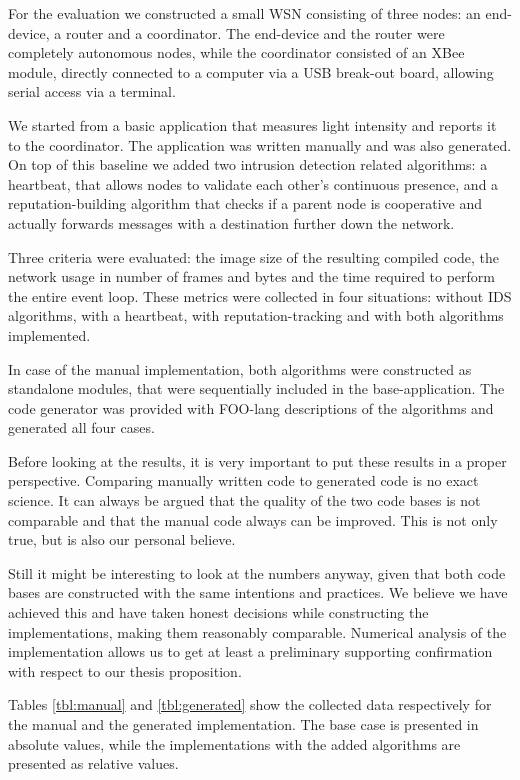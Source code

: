 \documentclass[conference]{IEEEtran}
\begin{document}
For the evaluation we constructed a small WSN consisting of three nodes: an
end-device, a router and a coordinator. The end-device and the router were
completely autonomous nodes, while the coordinator consisted of an XBee module,
directly connected to a computer via a USB break-out board, allowing serial
access via a terminal.

We started from a basic application that measures light intensity and reports
it to the coordinator. The application was written manually and was also
generated. On top of this baseline we added two intrusion detection related
algorithms: a heartbeat, that allows nodes to validate each other's continuous
presence, and a reputation-building algorithm that checks if a parent node is
cooperative and actually forwards messages with a destination further down the
network.

Three criteria were evaluated: the image size of the resulting compiled code,
the network usage in number of frames and bytes and the time required to
perform the entire event loop. These metrics were collected in four situations:
without IDS algorithms, with a heartbeat, with reputation-tracking and with
both algorithms implemented.

In case of the manual implementation, both algorithms were constructed as
standalone modules, that were sequentially included in the base-application.
The code generator was provided with FOO-lang descriptions of the algorithms
and generated all four cases.

Before looking at the results, it is very important to put these results in a
proper perspective. Comparing manually written code to generated code is no
exact science. It can always be argued that the quality of the two code bases
is not comparable and that the manual code always can be improved. This is not
only true, but is also our personal believe.

Still it might be interesting to look at the numbers anyway, given that both
code bases are constructed with the same intentions and practices. We believe
we have achieved this and have taken honest decisions while constructing the
implementations, making them reasonably comparable. Numerical analysis of the
implementation allows us to get at least a preliminary supporting confirmation
with respect to our thesis proposition.

Tables \ref{tbl:manual} and \ref{tbl:generated} show the collected data
respectively for the manual and the generated implementation. The base case is
presented in absolute values, while the implementations with the added
algorithms are presented as relative values.
\end{document}

